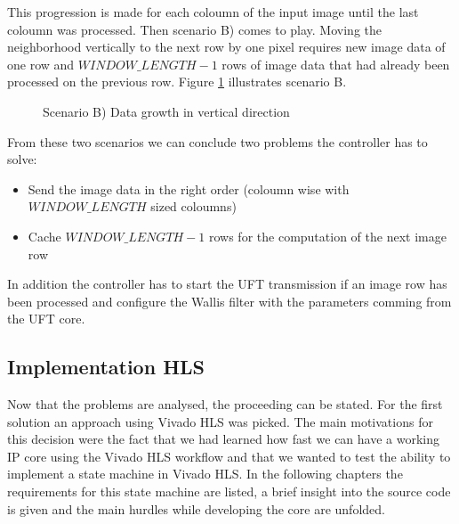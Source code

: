 This progression is made for each coloumn of the input image until the last
coloumn was processed. Then scenario B) comes to play. Moving the neighborhood
vertically to the next row by one pixel requires new image data of one row
and $WINDOW\_LENGTH-1$ rows of image data that had already been processed on the
previous row. Figure \ref{fig:memproblemgrowthy} illustrates scenario B.

\begin{figure}[h!]
    \centering
    \begin{adjustbox}{scale=0.7}
        
    \end{adjustbox}
    \caption{Scenario B) Data growth in vertical direction}
    \label{fig:memproblemgrowthy}
\end{figure}

\pagebreak

From these two scenarios we can conclude two problems the controller has to
solve:
\begin{itemize}
    \item Send the image data in the right order (coloumn wise with
    $WINDOW\_LENGTH$ sized coloumns)
    \item Cache $WINDOW\_LENGTH-1$ rows for the computation of the next image
    row
\end{itemize}

In addition the controller has to start the UFT transmission if an image row has
been processed and configure the Wallis filter with the parameters comming from
the UFT core.



\subsection{Implementation HLS} \label{ch:controller:hls}
Now that the problems are analysed, the proceeding can be stated. For the first
solution an approach using Vivado HLS was picked. The main motivations for this
decision were the fact that we had learned how fast we can have a working IP
core
using the Vivado HLS workflow and that we wanted to test the ability to
implement a state machine in Vivado HLS. In the following chapters the
requirements for this state machine are listed, a brief insight into the source
code is given and the main hurdles while developing the core are unfolded.


